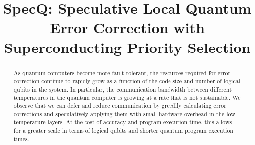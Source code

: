 \documentclass[conference]{IEEEtran}
\title{SpecQ: Speculative Local Quantum Error Correction with Superconducting Priority Selection}
\begin{document}
\maketitle
\thispagestyle{firstpage}
\pagestyle{plain}




\begin{abstract}

  As quantum computers become more fault-tolerant, the resources required for error correction continue to rapidly grow as a function of the code size and number of logical qubits in the system. In particular, the communication bandwidth between different temperatures in the quantum computer is growing at a rate that is not sustainable. We observe that we can defer and reduce communication by greedily calculating error corrections and speculatively applying them with small hardware overhead in the low-temperature layers. At the cost of accuracy and program execution time, this allows for a greater scale in terms of logical qubits and shorter quantum program execution times.

\end{abstract}







\end{document}

